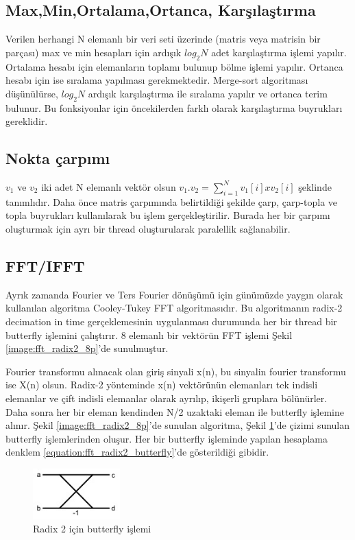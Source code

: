 \subsection{Max,Min,Ortalama,Ortanca, Karşılaştırma}
Verilen herhangi N elemanlı bir veri seti üzerinde (matris veya matrisin bir parçası) max ve min hesapları için ardışık $log_{2}N$ adet karşılaştırma işlemi yapılır. Ortalama hesabı için elemanların toplamı bulunup bölme işlemi yapılır. Ortanca hesabı için ise sıralama yapılması gerekmektedir. Merge-sort algoritması düşünülürse, $log_{2}N$ ardışık karşılaştırma ile sıralama yapılır ve ortanca terim bulunur. Bu fonksiyonlar için öncekilerden farklı olarak karşılaştırma buyrukları gereklidir. 

\subsection{Nokta çarpımı}
$v_{1}$ ve $v_{2}$ iki adet N elemanlı vektör olsun $v_{1} . v_{2} = \sum_{i=1}^{N} v_{1}[i] x v_{2}[i]$ şeklinde tanımlıdır. Daha önce matris çarpımında belirtildiği şekilde çarp, çarp-topla ve topla buyrukları kullanılarak bu işlem gerçekleştirilir. Burada her bir çarpımı oluşturmak için ayrı bir thread oluşturularak paralellik sağlanabilir.

\subsection{FFT/IFFT}
Ayrık zamanda Fourier ve Ters Fourier dönüşümü için günümüzde yaygın olarak kullanılan algoritma Cooley-Tukey FFT algoritmasıdır. \cite{cooleyTukey} Bu algoritmanın radix-2 decimation in time gerçeklemesinin uygulanması durumunda her bir thread bir butterfly işlemini çalıştırır. 8 elemanlı bir vektörün FFT işlemi Şekil \ref{image:fft_radix2_8p}'de sunulmuştur. \par

Fourier transformu alınacak olan giriş sinyali x(n), bu sinyalin fourier transformu ise X(n) olsun.
Radix-2 yönteminde x(n) vektörünün elemanları tek indisli elemanlar ve çift indisli elemanlar olarak ayrılıp, ikişerli gruplara bölünürler. Daha sonra her bir eleman kendinden N/2 uzaktaki eleman ile butterfly işlemine alınır. Şekil \ref{image:fft_radix2_8p}'de sunulan algoritma, Şekil \ref{image:fft_radix2_butterfly}'de çizimi sunulan butterfly işlemlerinden oluşur. Her bir butterfly işleminde yapılan hesaplama denklem \ref{equation:fft_radix2_butterfly}'de gösterildiği gibidir.

\begin{figure}
\centering
\shorthandoff{=}
\includegraphics[width=0.3\textwidth]{gorsel/fft_radix2_butterfly.jpg}
\shorthandoff{=}
\caption{Radix 2 için butterfly işlemi}
\label{image:fft_radix2_butterfly}
\end{figure}

